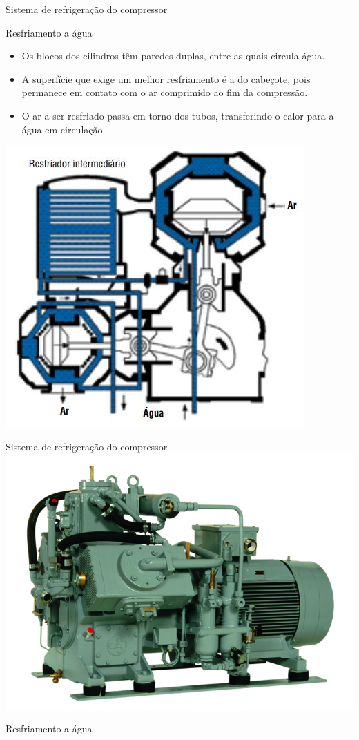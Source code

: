 \begin{frame}{Sistema de refrigeração do compressor}
	\begin{block}{Resfriamento a água}
		\begin{itemize}
			\item Os blocos dos cilindros têm paredes duplas,	entre as quais circula água.
			\item A superfície que exige um melhor resfriamento é a do cabeçote, pois permanece em contato	com o ar comprimido ao fim da compressão. 
			\item O ar a ser resfriado passa em torno dos tubos, transferindo o calor para a água em circulação.
		\end{itemize}
	\end{block}

\centering
\includegraphics[height=0.5\textheight]{Figuras/Ch12/fig11n2}

\end{frame}


\begin{frame}{Sistema de refrigeração do compressor}
	\centering
	\includegraphics[width=0.8\linewidth]{Figuras/Ch12/fig11}
	
	Resfriamento a água
\end{frame}


